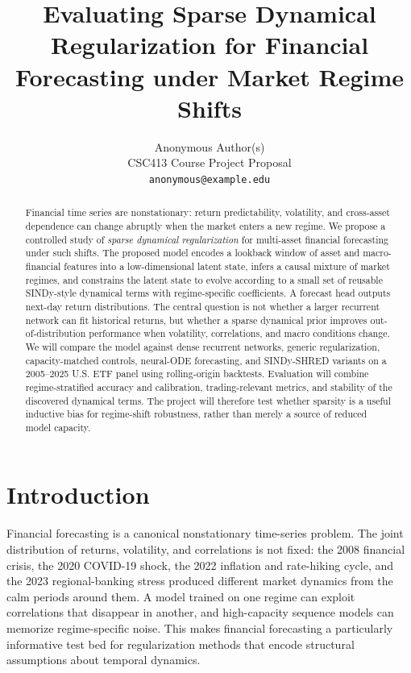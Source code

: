 \documentclass{article}
\title{Evaluating Sparse Dynamical Regularization for Financial Forecasting under Market Regime Shifts}
\author{%
  Anonymous Author(s) \\
  CSC413 Course Project Proposal \\
  \texttt{anonymous@example.edu}
}
\begin{document}
\maketitle

\begin{abstract}
Financial time series are nonstationary: return predictability, volatility, and cross-asset dependence can change abruptly when the market enters a new regime. We propose a controlled study of \emph{sparse dynamical regularization} for multi-asset financial forecasting under such shifts. The proposed model encodes a lookback window of asset and macro-financial features into a low-dimensional latent state, infers a causal mixture of market regimes, and constrains the latent state to evolve according to a small set of reusable SINDy-style dynamical terms with regime-specific coefficients. A forecast head outputs next-day return distributions. The central question is not whether a larger recurrent network can fit historical returns, but whether a sparse dynamical prior improves out-of-distribution performance when volatility, correlations, and macro conditions change. We will compare the model against dense recurrent networks, generic regularization, capacity-matched controls, neural-ODE forecasting, and SINDy-SHRED variants on a 2005--2025 U.S. ETF panel using rolling-origin backtests. Evaluation will combine regime-stratified accuracy and calibration, trading-relevant metrics, and stability of the discovered dynamical terms. The project will therefore test whether sparsity is a useful inductive bias for regime-shift robustness, rather than merely a source of reduced model capacity.
\end{abstract}

\section{Introduction}

Financial forecasting is a canonical nonstationary time-series problem. The joint distribution of returns, volatility, and correlations is not fixed: the 2008 financial crisis, the 2020 COVID-19 shock, the 2022 inflation and rate-hiking cycle, and the 2023 regional-banking stress produced different market dynamics from the calm periods around them. A model trained on one regime can exploit correlations that disappear in another, and high-capacity sequence models can memorize regime-specific noise. This makes financial forecasting a particularly informative test bed for regularization methods that encode structural assumptions about temporal dynamics.
\end{document}

